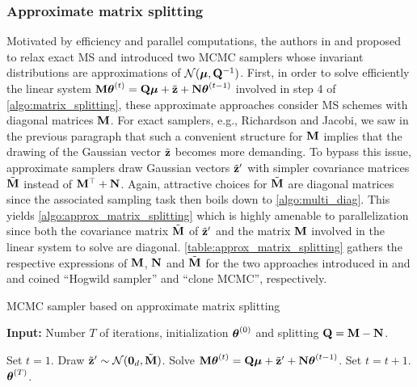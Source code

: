 \documentclass[nohypdvips,onefignum,onetabnum]{siamart171218}
\begin{document}
\subsubsection{Approximate matrix splitting}  \label{subsec:matrix_split_approx}
Motivated by efficiency and parallel computations, the authors in \cite{Barbos2017} and \cite{Johnson2013} proposed to relax exact MS and introduced two MCMC samplers whose invariant distributions are  approximations of $\mathcal{N}(\boldsymbol{\mu},\mathbf{Q}^{-1})$. 
First, in order to solve efficiently the linear system $\mathbf{M}\boldsymbol{\theta}^{(t)} = \mathbf{Q}\boldsymbol{\mu} + \tilde{\mathbf{z}}+\mathbf{N}\boldsymbol{\theta}^{(t-1)}$ involved in step 4 of \cref{algo:matrix_splitting}, these approximate approaches consider MS schemes with diagonal matrices $\mathbf{M}$.
For exact samplers, e.g., Richardson and Jacobi, we saw in the previous paragraph that such a convenient structure for $\mathbf{M}$ implies that the drawing of the Gaussian vector $\tilde{\mathbf{z}}$ becomes more demanding. 
To bypass this issue, approximate samplers draw Gaussian vectors $\tilde{\mathbf{z}}'$ with simpler covariance matrices $\tilde{\mathbf{M}}$ instead of $\mathbf{M}^{\top} + \mathbf{N}$.
Again, attractive choices for $\tilde{\mathbf{M}}$ are diagonal matrices since the associated sampling task then boils down to \cref{algo:multi_diag}.
This yields \cref{algo:approx_matrix_splitting} which is highly amenable to parallelization since both the covariance matrix $\tilde{\mathbf{M}}$ of $\tilde{\mathbf{z}}'$ and the matrix $\mathbf{M}$ involved in the linear system to solve are diagonal.
\cref{table:approx_matrix_splitting} gathers the respective expressions of $\mathbf{M}$, $\mathbf{N}$ and $\tilde{\mathbf{M}}$ for the two approaches introduced in \cite{Johnson2013} and \cite{Barbos2017} and coined ``Hogwild sampler'' and ``clone MCMC'', respectively.
\begin{algorithm}
\caption{MCMC sampler based on approximate matrix splitting}
\label{algo:approx_matrix_splitting}
\hspace*{\algorithmicindent} \textbf{Input:} Number $T$ of iterations, initialization $\boldsymbol{\theta}^{(0)}$ and splitting $\mathbf{Q} = \mathbf{M} - \mathbf{N}$.
\begin{algorithmic}[1]
\State Set $t = 1$.
  \State Draw $\tilde{\mathbf{z}}' \sim \mathcal{N}(\mathbf{0}_d,\tilde{\mathbf{M}})$.   
  \State Solve $\mathbf{M}\boldsymbol{\theta}^{(t)} = \mathbf{Q}\boldsymbol{\mu} + \tilde{\mathbf{z}}' + \mathbf{N}\boldsymbol{\theta}^{(t-1)}$.
  \State Set $t = t + 1$.
\EndWhile\\
\Return $\boldsymbol{\theta}^{(T)}$.
\end{algorithmic}
\end{algorithm}
\end{document}
